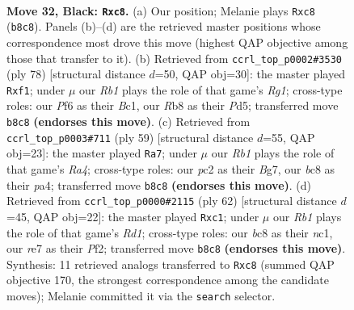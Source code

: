 \documentclass[11pt]{article}
\begin{document}
\clearpage

\begin{figure}[p]\centering
\begin{subfigure}{0.46\textwidth}\centering
\resizebox{\linewidth}{!}{%
\newchessgame
\chessboard[
  setfen={1rB4k/p3R2p/2p2ppB/8/5P1P/3P1N2/PPP2PK1/8 b - - 0 32},
  showmover=false,
  pgfstyle=straightmove, color=movearrow, markmove={b8-c8}
]}
\caption{}
\end{subfigure}\hfill
\begin{subfigure}{0.46\textwidth}\centering
\resizebox{\linewidth}{!}{%
\newchessgame
\chessboard[
  setfen={1r6/p3k2p/3pn1p1/P1pP4/4P2P/5P2/5K2/2B2bR1 w - - 0 40},
  showmover=false,
  pgfstyle=straightmove, color=movearrow, markmove={g1-f1}
]}
\caption{}
\end{subfigure}
\\[4pt]
\begin{subfigure}{0.46\textwidth}\centering
\resizebox{\linewidth}{!}{%
\newchessgame
\chessboard[
  setfen={1r4k1/5pb1/6p1/rBPp4/P4pP1/5N2/5PKP/2R5 b - - 1 30},
  showmover=false,
  pgfstyle=straightmove, color=movearrow, markmove={a5-a7}
]}
\caption{}
\end{subfigure}\hfill
\begin{subfigure}{0.46\textwidth}\centering
\resizebox{\linewidth}{!}{%
\newchessgame
\chessboard[
  setfen={1r4k1/4bppp/8/1P2P2P/2p2P2/3p4/1P3PB1/1KnR4 w - - 0 32},
  showmover=false,
  pgfstyle=straightmove, color=movearrow, markmove={d1-c1}
]}
\caption{}
\end{subfigure}
\caption{\textbf{Move 32, Black: \texttt{Rxc8}.} (a) Our position; Melanie plays \texttt{Rxc8} (\texttt{b8c8}). Panels (b)--(d) are the retrieved master positions whose correspondence most drove this move (highest QAP objective among those that transfer to it). (b) Retrieved from \texttt{ccrl\_top\_p0002\#3530} (ply 78) [structural distance $d$=50, QAP obj=30]: the master played \texttt{Rxf1}; under $\mu$ our \emph{Rb1} plays the role of that game's \emph{Rg1}; cross-type roles: our \emph{P}f6 as their \emph{B}c1, our \emph{R}b8 as their \emph{P}d5; transferred move \texttt{b8c8} \textbf{(endorses this move)}. (c) Retrieved from \texttt{ccrl\_top\_p0003\#711} (ply 59) [structural distance $d$=55, QAP obj=23]: the master played \texttt{Ra7}; under $\mu$ our \emph{Rb1} plays the role of that game's \emph{Ra4}; cross-type roles: our \emph{p}c2 as their \emph{B}g7, our \emph{b}c8 as their \emph{p}a4; transferred move \texttt{b8c8} \textbf{(endorses this move)}. (d) Retrieved from \texttt{ccrl\_top\_p0000\#2115} (ply 62) [structural distance $d$=45, QAP obj=22]: the master played \texttt{Rxc1}; under $\mu$ our \emph{Rb1} plays the role of that game's \emph{Rd1}; cross-type roles: our \emph{b}c8 as their \emph{n}c1, our \emph{r}e7 as their \emph{P}f2; transferred move \texttt{b8c8} \textbf{(endorses this move)}. Synthesis: 11 retrieved analogs transferred to \texttt{Rxc8} (summed QAP objective 170, the strongest correspondence among the candidate moves); Melanie committed it via the \texttt{search} selector.}
\label{fig:thought-m63}
\end{figure}
\end{document}
